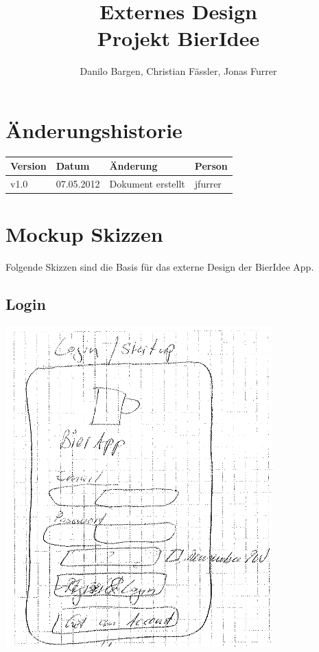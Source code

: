 \documentclass[10pt,a4paper]{scrartcl}
\author{Danilo Bargen, Christian Fässler, Jonas Furrer}
\title{Externes Design\\ Projekt BierIdee}
\begin{document}
\begin{titlepage}
	\maketitle
	\vspace{120mm}
	\thispagestyle{empty} %
\end{titlepage}

\tableofcontents
\newpage

\section*{Änderungshistorie}
\begin{tabular}{p{}p{}p{}p{}}
\toprule
\textbf{Version} & \textbf{Datum} & \textbf{Änderung} & \textbf{Person} \\  
\midrule
v1.0 & 07.05.2012 & Dokument erstellt & jfurrer \\  
\bottomrule
\end{tabular} 
\newpage

\section{Mockup Skizzen}
Folgende Skizzen sind die Basis für das externe Design der BierIdee App.
\subsection{Login}
\includegraphics[scale=.5]{login-skizze.png}
\end{document}
